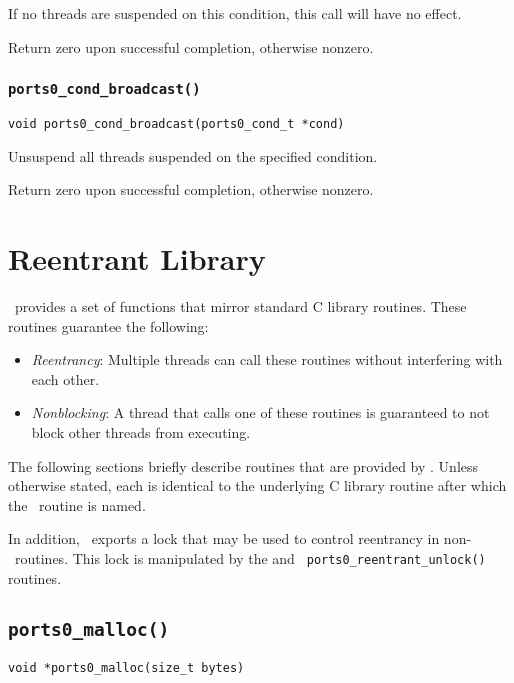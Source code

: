 If no threads are suspended on this condition, this call will have no
effect.

Return zero upon successful completion, otherwise nonzero.


\subsubsection{\tt ports0\_cond\_broadcast()}
\begin{verbatim}
void ports0_cond_broadcast(ports0_cond_t *cond)
\end{verbatim}

Unsuspend all threads suspended on the specified condition.

Return zero upon successful completion, otherwise nonzero.


\section{Reentrant Library}

\portszero\ provides a set of functions that mirror standard C
library routines.  These routines guarantee the following:

\begin{itemize}

\item {\em Reentrancy}:  Multiple threads can call these routines without
interfering with each other.

\item {\em Nonblocking}: A thread that calls one of these routines
is guaranteed to not block other threads from executing.

\end{itemize}

The following sections briefly describe routines that are provided by
\portszero.  Unless otherwise stated, each is identical to the
underlying C library routine after which the \portszero\ routine is
named.

In addition, \portszero\ exports a lock that may be used to control
reentrancy in non-\portszero\ routines.  This lock is manipulated by
the and {\tt
ports0\_reentrant\_unlock()} routines.


\subsection{\tt ports0\_malloc()}
\begin{verbatim}
void *ports0_malloc(size_t bytes)
\end{verbatim}

